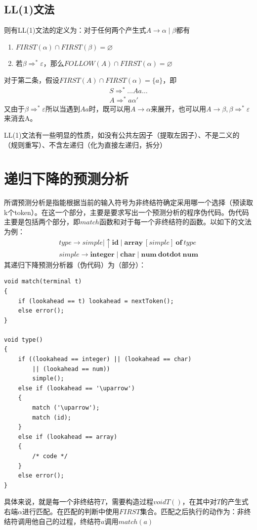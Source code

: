 \documentclass[]{report}
\begin{document}
		\subsection{LL(1)文法}
		则有LL(1)文法的定义为：对于任何两个产生式$A\to\alpha\mid\beta$都有
		\begin{enumerate}
			\item $FIRST(\alpha)\cap FIRST(\beta)=\varnothing$
			\item 若$\beta\Rightarrow^*\varepsilon$，那么$FOLLOW(A)\cap FIRST(\alpha)=\varnothing$
		\end{enumerate}
		对于第二条，假设$FIRST(A)\cap FIRST(\alpha)=\{a\}$，即
		\[\begin{gathered}
			S\Rightarrow^*\dots Aa\dots\\
			A\Rightarrow^*a\alpha'
		\end{gathered}\]
		又由于$\beta\Rightarrow^*\varepsilon$所以当遇到$Aa$时，既可以用$A\to\alpha$来展开，也可以用$A\to\beta,\beta\Rightarrow^*\varepsilon$来消去A。\par
		LL(1)文法有一些明显的性质，如没有公共左因子（提取左因子）、不是二义的（规则重写）、不含左递归（化为直接左递归，拆分）
		\section{递归下降的预测分析}
		所谓预测分析是指能根据当前的输入符号为非终结符确定采用哪一个选择（预读取k个token）。在这一个部分，主要是要求写出一个预测分析的程序伪代码。伪代码主要是包括两个部分，即$match$函数和对于每一个非终结符的函数。以如下的文法为例：
		\[\begin{gathered}
			type\to simple\mid\uparrow\mathbf{id}\mid\mathbf{array}\ [simple]\ \mathbf{of}\ type\\
			simple\to\mathbf{integer}\mid\mathbf{char}\mid\mathbf{num\ dotdot\ num}
		\end{gathered}\]
		其递归下降预测分析器（伪代码）为（部分）：
		\begin{lstlisting}
void match(terminal t)
{
	if (lookahead == t) lookahead = nextToken();
	else error();
}

void type()
{
	if ((lookahead == integer) || (lookahead == char)
		|| (lookahead == num))
		simple();
	else if (lookahead == '\uparrow')
	{
		match ('\uparrow');
		match (id);
	}
	else if (lookahead == array)
	{
		/* code */
	}
	else error();
}
		\end{lstlisting}
		具体来说，就是每一个非终结符$T$，需要构造过程$void T()$，在其中对$T$的产生式右端$\alpha$进行匹配。在匹配的判断中使用$FIRST$集合。匹配之后执行的动作为：非终结符调用他自己的过程，终结符$a$调用$match(a)$
\end{document}
